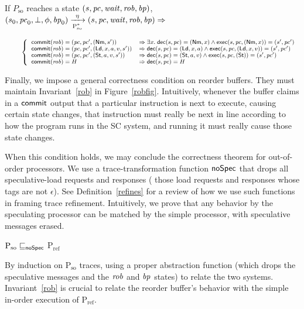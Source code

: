 \begin{figure*}[t]
\begin{inv}
If $P_\text{so}$ reaches a state $(s, \pc, \wait, \rob, \ppc)$, \ie{}\hspace{.2cm}
$\io{P$_\text{so}^{*}$}{s_0,\pc_0,\bot,\phi,\ppc_0}{s,\pc,\wait,\rob,\ppc}{\eta} \Rightarrow$

\begin{math}
\small
\;\;\;\;\;\;\;\;\left\{
\begin{array}{ll}
\commit(\rob) = (\pc, \pc', (\nm, s')) &\Rightarrow
\exists x. \; \dec(s,\pc) = (\nm, x) \wedge \exec(s,\pc, (\nm,x)) =
(s',\pc')\\
\commit(\rob) = (\pc, \pc', (\ld, x, a, v, s')) & \Rightarrow
\dec(s,\pc) = (\ld, x,a) \wedge \exec(s,\pc, (\ld,x,v)) = (s',\pc')\\
\commit(\rob) = (\pc, \pc', (\st, a, v, s')) &\Rightarrow
\dec(s,\pc) = (\st, a,v) \wedge \exec(s,\pc, (\st)) =
(s',\pc')\\
\commit(\rob) = H & \Rightarrow
\dec(s, \pc) = H\\
\end{array}
\right.\end{math}
\label{rob}
\end{inv}
\vspace{-.5cm}
\caption{Correctness of reorder buffer}
\label{robfig}
\end{figure*}

Finally, we impose a general correctness condition on reorder
buffers.  They must maintain Invariant~\ref{rob} in Figure~\ref{robfig}.
Intuitively, whenever the buffer claims in a $\commit$
output that a particular instruction is next to execute, causing
certain state changes, that instruction must really be next in line according
to how the program runs in the SC system, and running it must really cause
those state changes.

When this condition holds, we may conclude the correctness theorem for
out-of-order processors.  We use a trace-transformation function
$\noSpec$ that drops all speculative-load requests and responses (\ie{} those load requests and responses whose tags are not $\epsilon$).
See Definition~\ref{refines} for a review of how we use such
functions in framing trace refinement.  Intuitively, we prove that any
behavior by the speculating processor can be matched by the simple
processor, with speculative messages erased.
\begin{theorem}
\label{ocorrect}
$\text{P$_\text{so}$} \sqsubseteq_\noSpec$ P$_\text{ref}$
\end{theorem}
\begin{prf}
By induction on P$_\text{so}$ traces, using a proper abstraction
function (which drops the speculative messages and the $\rob$ and $\ppc$ states) to relate the two systems.  Invariant~\ref{rob} is crucial to
relate the reorder buffer's behavior with the simple in-order
execution of P$_\text{ref}$.
\end{prf}

